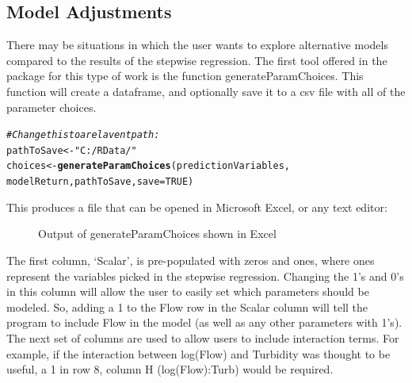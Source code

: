 \documentclass[a4paper,11pt]{article}\usepackage[]{graphicx}\usepackage[]{color}
\makeatletter
\newcommand{\hlnum}[1]{\textcolor[rgb]{0.686,0.059,0.569}{#1}}%
\newcommand{\hlstr}[1]{\textcolor[rgb]{0.192,0.494,0.8}{#1}}%
\newcommand{\hlcom}[1]{\textcolor[rgb]{0.678,0.584,0.686}{\textit{#1}}}%
\newcommand{\hlstd}[1]{\textcolor[rgb]{0.345,0.345,0.345}{#1}}%
\newcommand{\hlkwb}[1]{\textcolor[rgb]{0.69,0.353,0.396}{#1}}%
\newcommand{\hlkwc}[1]{\textcolor[rgb]{0.333,0.667,0.333}{#1}}%
\newcommand{\hlkwd}[1]{\textcolor[rgb]{0.737,0.353,0.396}{\textbf{#1}}}%
\newenvironment{kframe}{%
 \def\at@end@of@kframe{}%
 \ifinner\ifhmode%
  \def\at@end@of@kframe{\end{minipage}}%
  \begin{minipage}{\columnwidth}%
 \fi\fi%
 \def\FrameCommand##1{\hskip\@totalleftmargin \hskip-\fboxsep
 \colorbox{shadecolor}{##1}\hskip-\fboxsep
     \hskip-\linewidth \hskip-\@totalleftmargin \hskip\columnwidth}%
 \MakeFramed {\advance\hsize-\width
   \@totalleftmargin\z@ \linewidth\hsize
   \@setminipage}}%
 {\par\unskip\endMakeFramed%
 \at@end@of@kframe}
\newenvironment{knitrout}{}{} %
\makeatother
\begin{document}
\FloatBarrier

\subsection{Model Adjustments}
There may be situations in which the user wants to explore alternative models compared to the results of the stepwise regression. The first tool offered in the package for this type of work is the function generateParamChoices. This function will create a dataframe, and optionally save it to a csv file with all of the parameter choices.

\begin{knitrout}
\color{fgcolor}\begin{kframe}
\begin{alltt}
\hlcom{#Change this to a relavent path:}
\hlstd{pathToSave} \hlkwb{<-} \hlstr{"C:/RData/"}
\hlstd{choices} \hlkwb{<-} \hlkwd{generateParamChoices}\hlstd{(predictionVariables,}
                                \hlstd{modelReturn,pathToSave,}\hlkwc{save}\hlstd{=}\hlnum{TRUE}\hlstd{)}
\end{alltt}
\end{kframe}
\end{knitrout}



This produces a file that can be opened in Microsoft Excel, or any text editor:

\begin{figure}[ht!]
\centering
\caption{Output of generateParamChoices shown in Excel}
\label{overflow}
\end{figure}

The first column, `Scalar', is pre-populated with zeros and ones, where ones represent the variables picked in the stepwise regression. Changing the 1's and 0's in this column will allow the user to easily set which parameters should be modeled. So, adding a 1 to the Flow row in the Scalar column will tell the program to include Flow in the model (as well as any other parameters with 1's). The next set of columns are used to allow users to include interaction terms. For example, if the interaction between log(Flow) and Turbidity was thought to be useful, a 1 in row 8, column H (log(Flow):Turb) would be required.
\end{document}

